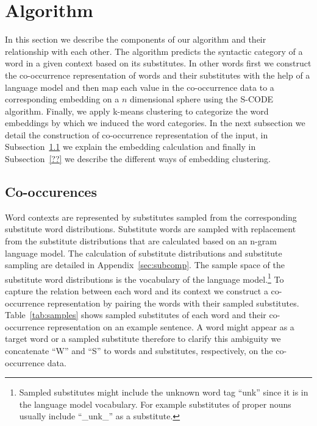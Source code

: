 \section{Algorithm}

In this section we describe the components of our algorithm and their
relationship with each other.  The algorithm predicts the syntactic
category of a word in a given context based on its substitutes.  In
other words first we construct the co-occurrence representation of
words and their substitutes with the help of a language model and then
map each value in the co-occurrence data to a corresponding embedding
on a $n$ dimensional sphere using the S-CODE algorithm.  Finally, we
apply k-means clustering to categorize the word embeddings by which we
induced the word categories.  In the next subsection we detail the
construction of co-occurrence representation of the input, in
Subsection~\ref{sec:cooc} we explain the embedding calculation and
finally in Subsection~\ref{??} we describe the different ways of
embedding clustering.

\subsection{Co-occurences}
\label{sec:cooc}

Word contexts are represented by substitutes sampled from the
corresponding substitute word distributions.  Substitute words are
sampled with replacement from the substitute distributions that are
calculated based on an n-gram language model.  The calculation of
substitute distributions and substitute sampling are detailed in
Appendix~\ref{sec:subcomp}. The
sample space of the substitute word distributions is the vocabulary of
the language model.\footnote{Sampled substitutes might include the
  unknown word tag ``unk'' since it is in the language model
  vocabulary.  For example substitutes of proper nouns usually include
  ``\_unk\_'' as a substitute.}  To capture the relation between each
word and its context we construct a co-occurrence representation by
pairing the words with their sampled substitutes.
Table~\ref{tab:samples} shows sampled substitutes of each word and
their co-occurrence representation on an example sentence.  A word
might appear as a target word or a sampled substitute therefore to
clarify this ambiguity we concatenate ``W'' and ``S'' to words and
substitutes, respectively, on the co-occurrence data.

